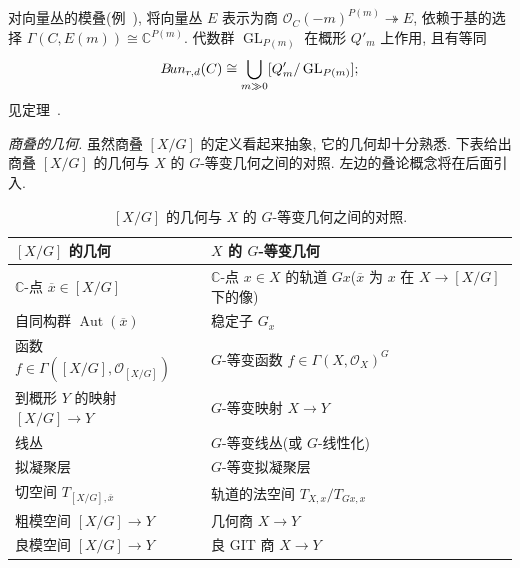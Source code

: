 \begin{example}[向量丛的模叠作为商]\label{src:1.6.14}
对向量丛的模叠(例~), 将向量丛 $E$ 表示为商 $\mathcal O_C(-m)^{P(m)}\twoheadrightarrow E$, 依赖于基的选择 $\Gamma(C,E(m))\cong\mathbb C^{P(m)}$. 代数群 $\operatorname{GL}_{P(m)}$ 在概形 $Q'_m$ 上作用, 且有等同
\[
B\!un_{r,d}(C)\cong\bigcup_{m\gg0}[Q'_m/\operatorname{GL}_{P(m)}];
\]
见定理~.
\end{example}
\textit{商叠的几何.} 虽然商叠 $[X/G]$ 的定义看起来抽象, 它的几何却十分熟悉. 下表给出商叠 $[X/G]$ 的几何与 $X$ 的 $G$-等变几何之间的对照. 左边的叠论概念将在后面引入.
\begin{table}[H]
\centering
\begin{tabularx}{\textwidth}{@{}X X@{}}
\toprule
$[X/G]$ 的几何 & $X$ 的 $G$-等变几何\\
\midrule
$\mathbb C$-点 $\overline x\in[X/G]$ &
$\mathbb C$-点 $x\in X$ 的轨道 $Gx$($\overline x$ 为 $x$ 在 $X\to[X/G]$ 下的像)\\
自同构群 $\operatorname{Aut}(\overline x)$ & 稳定子 $G_x$\\
函数 $f\in\Gamma([X/G],\mathcal O_{[X/G]})$ & $G$-等变函数 $f\in\Gamma(X,\mathcal O_X)^G$\\
到概形 $Y$ 的映射 $[X/G]\to Y$ & $G$-等变映射 $X\to Y$\\
线丛 & $G$-等变线丛(或 $G$-线性化)\\
拟凝聚层 & $G$-等变拟凝聚层\\
切空间 $T_{[X/G],\overline x}$ & 轨道的法空间 $T_{X,x}/T_{Gx,x}$\\
粗模空间 $[X/G]\to Y$ & 几何商 $X\to Y$\\
良模空间 $[X/G]\to Y$ & 良 GIT 商 $X\to Y$\\
\bottomrule
\end{tabularx}
\caption{$[X/G]$ 的几何与 $X$ 的 $G$-等变几何之间的对照.}\label{src:1.6.15}
\end{table}
